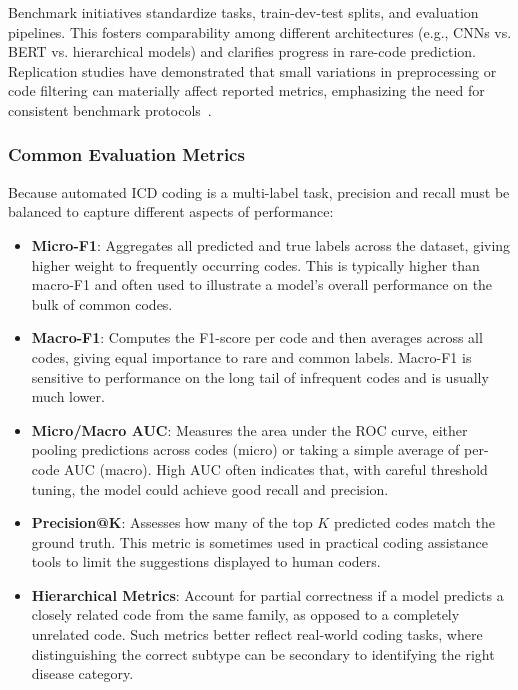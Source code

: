 Benchmark initiatives standardize tasks, train-dev-test splits, and evaluation pipelines. This fosters comparability among different architectures (e.g., CNNs vs. BERT vs. hierarchical models) and clarifies progress in rare-code prediction. Replication studies have demonstrated that small variations in preprocessing or code filtering can materially affect reported metrics, emphasizing the need for consistent benchmark protocols~\citep{edin2023automated}.

\subsubsection{Common Evaluation Metrics}

Because automated ICD coding is a multi-label task, precision and recall must be balanced to capture different aspects of performance:

\begin{itemize}
    \item \textbf{Micro-F1}: Aggregates all predicted and true labels across the dataset, giving higher weight to frequently occurring codes. This is typically higher than macro-F1 and often used to illustrate a model's overall performance on the bulk of common codes.
    \item \textbf{Macro-F1}: Computes the F1-score per code and then averages across all codes, giving equal importance to rare and common labels. Macro-F1 is sensitive to performance on the long tail of infrequent codes and is usually much lower.
    \item \textbf{Micro/Macro AUC}: Measures the area under the ROC curve, either pooling predictions across codes (micro) or taking a simple average of per-code AUC (macro). High AUC often indicates that, with careful threshold tuning, the model could achieve good recall and precision.
    \item \textbf{Precision@K}: Assesses how many of the top \(K\) predicted codes match the ground truth. This metric is sometimes used in practical coding assistance tools to limit the suggestions displayed to human coders.
    \item \textbf{Hierarchical Metrics}: Account for partial correctness if a model predicts a closely related code from the same family, as opposed to a completely unrelated code. Such metrics better reflect real-world coding tasks, where distinguishing the correct subtype can be secondary to identifying the right disease category.
\end{itemize}

